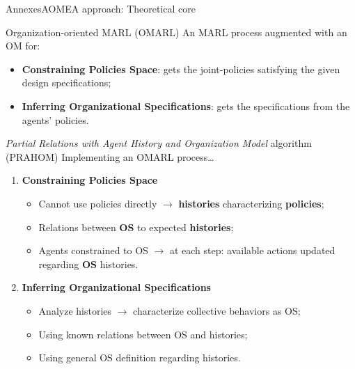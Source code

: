 \begin{frame}{Annexes}{AOMEA approach: Theoretical core}

    \begin{block}{Organization-oriented MARL (OMARL)}
        An MARL process augmented with an OM for:
        \begin{itemize}
            \item \textbf{Constraining Policies Space}: gets the joint-policies satisfying the given design specifications;
            \item \textbf{Inferring Organizational Specifications}: gets the specifications from the agents' policies.
        \end{itemize}

    \end{block}

    \begin{block}{\emph{Partial Relations with Agent History and Organization Model} algorithm (PRAHOM)}
        Implementing an OMARL process\dots
        \begin{enumerate}
            \item \textbf{Constraining Policies Space}
                  \begin{itemize}
                      \item Cannot use policies directly $\rightarrow$ \textbf{histories} characterizing \textbf{policies};
                      \item Relations between \textbf{OS} to expected \textbf{histories};
                      \item Agents constrained to OS $\rightarrow$ at each step: available actions updated regarding \textbf{OS} histories.
                  \end{itemize}

            \item \textbf{Inferring Organizational Specifications}
                  \begin{itemize}
                      \item Analyze histories $\rightarrow$ characterize collective behaviors as OS;
                      \item Using known relations between OS and histories;
                      \item Using general OS definition regarding histories.
                  \end{itemize}
        \end{enumerate}
    \end{block}
\end{frame}

